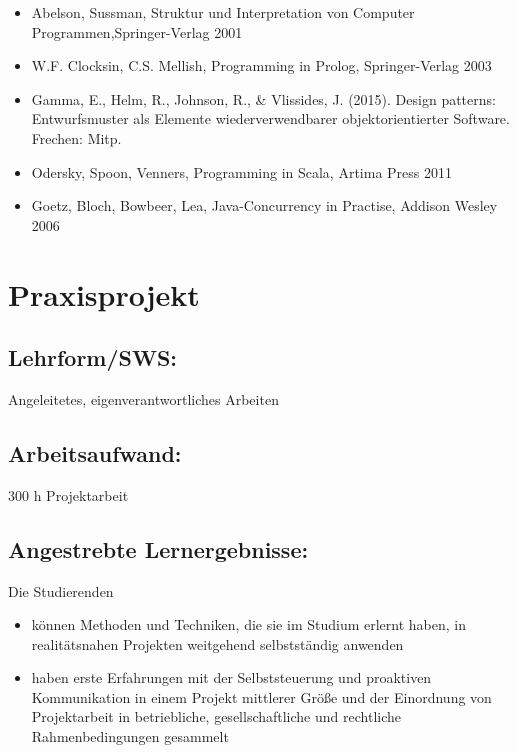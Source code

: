 \begin{itemize}
\tightlist
\item
  Abelson, Sussman, Struktur und Interpretation von Computer
  Programmen,Springer-Verlag 2001
\item
  W.F. Clocksin, C.S. Mellish, Programming in Prolog, Springer-Verlag
  2003
\item
  Gamma, E., Helm, R., Johnson, R., \& Vlissides, J. (2015). Design
  patterns: Entwurfsmuster als Elemente wiederverwendbarer
  objektorientierter Software. Frechen: Mitp.
\item
  Odersky, Spoon, Venners, Programming in Scala, Artima Press 2011
\item
  Goetz, Bloch, Bowbeer, Lea, Java-Concurrency in Practise, Addison
  Wesley 2006
\end{itemize}

\chapter{Praxisprojekt}\label{praxisprojekt}

\section{Lehrform/SWS:}\label{lehrformsws-18}

Angeleitetes, eigenverantwortliches Arbeiten

\section{Arbeitsaufwand:}\label{arbeitsaufwand-18}

300 h Projektarbeit

\section{Angestrebte
Lernergebnisse:}\label{angestrebte-lernergebnisse-18}

Die Studierenden

\begin{itemize}
\item
  können Methoden und Techniken, die sie im Studium erlernt haben, in
  realitätsnahen Projekten weitgehend selbstständig anwenden
\item
  haben erste Erfahrungen mit der Selbststeuerung und proaktiven
  Kommunikation in einem Projekt mittlerer Größe und der Einordnung von
  Projektarbeit in betriebliche, gesellschaftliche und rechtliche
  Rahmenbedingungen gesammelt
\end{itemize}

